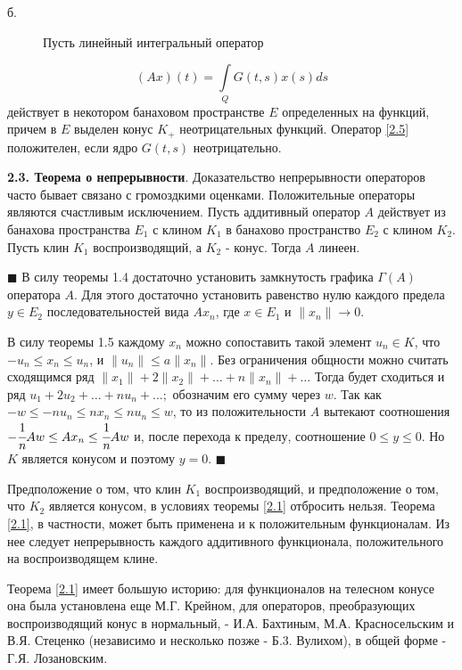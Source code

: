 \documentclass[a4paper, 12pt,fleqn]{article}
\newenvironment{customthm}[1]
  {\renewcommand\thetheorem{#1}\theorem}
  {\endtheorem}
\begin{document}
  \pagestyle{fancy}
  \setcounter{page}{18}
  \begin{description}
    \item[б.]Пусть линейный интегральный оператор
  \end{description}
  \begin{equation} \tag{2.5}\label{2.5}
    (Ax)(t)=\underset{Q}{\int} G(t, s)x(s)ds
  \end{equation}
  действует в некотором банаховом пространстве $E$ определенных на функций, причем в
  $E$ выделен конус $K_{+}$ неотрицательных функций. Оператор \eqref{2.5}
  положителен, если ядро
  $G(t, s)$ неотрицательно.
  
  \textbf{2.3. Теорема о непрерывности}. Доказательство непрерывности операторов часто бывает
  связано с громоздкими оценками. Положительные операторы являются счастливым исключением.
  \begin{customthm}{2.1}\label{2.1} Пусть аддитивный оператор $A$ действует из банахова пространства $E_1$ с клином $K_1$ в
  банахово пространство $E_2$ с клином $K_2$. Пусть клин $K_1$ воспроизводящий, а $K_2$ - конус.
  Тогда $A$ линеен.
  \end{customthm}
  
  $\blacksquare$ В силу теоремы 1.4 достаточно установить замкнутость графика $\Gamma(A)$
  оператора $A$. Для этого достаточно установить равенство нулю каждого предела $y\in E_2$
  последовательностей вида $Ax_n$, где $x\in E_1$ и $\| x_n\|\to 0$.
  
  В силу теоремы 1.5 каждому $x_n$ можно сопоставить такой элемент $u_n\in K$, что $-u_n\leq x_n\leq u_n$,
  и $\|u_n\|\leq a\|x_n\|$. Без ограничения общности можно считать
  сходящимся ряд $\|x_1\|+2\|x_2\|+{\dots} +n\|x_n\|+\dots$
  Тогда будет сходиться и ряд $u_1+2u_2+ {\dots} +nu_n+\dots;$ обозначим его сумму через
  $w$. Так как $-w\leq-nu_n\leq nx_n \leq nu_n \leq w$, то из положительности $A$
  вытекают соотношения $-\cfrac{1}{n}Aw\leq Ax_n\leq\cfrac{1}{n}Aw$ и, после перехода к пределу,
   соотношение $0\leq y \leq 0$. Но $K$ является конусом и поэтому $y = 0$. $\blacksquare$
  
  Предположение о том, что клин $K_1$ воспроизводящий, и предположение о том, что $K_2$ является конусом,
  в условиях теоремы \ref{2.1} отбросить нельзя. Теорема \ref{2.1}, в частности, может быть
  применена и к положительным функционалам. Из нее следует непрерывность каждого
  аддитивного функционала, положительного на воспроизводящем клине.
  
  Теорема \ref{2.1} имеет большую историю: для функционалов на телесном конусе она была
  установлена еще М.Г. Крейном, для операторов, преобразующих воспроизводящий конус
  в нормальный, - И.А. Бахтиным, М.А. Красносельским и В.Я. Стеценко (независимо и
  несколько позже - Б.3. Вулихом), в общей форме - Г.Я. Лозановским.
  
\end{document}
